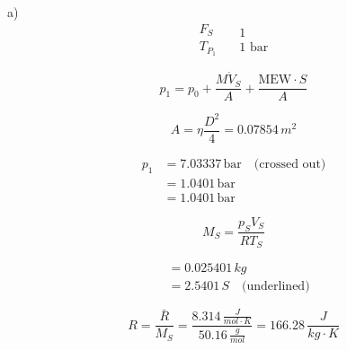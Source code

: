 a) \\
\[
\begin{array}{c}
F_S \\
\hline
T_{P_1}
\end{array}
\quad
\begin{array}{c}
1 \\
\hline
1 \text{ bar}
\end{array}
\]

\[
p_1 = p_0 + \frac{M \dot{V}_S}{A} + \frac{\text{MEW} \cdot S}{A}
\]

\[
A = \eta \frac{D^2}{4} = 0.07854 \, m^2
\]

\[
\begin{aligned}
p_1 &= 7.03337 \, \text{bar} \quad \text{(crossed out)} \\
&= 1.0401 \, \text{bar} \\
&= 1.0401 \, \text{bar}
\end{aligned}
\]

\[
M_S = \frac{p_S V_S}{R T_S}
\]

\[
\begin{aligned}
&= 0.025401 \, kg \\
&= 2.5401 \, S \quad \text{(underlined)}
\end{aligned}
\]

\[
R = \frac{\bar{R}}{M_S} = \frac{8.314 \, \frac{J}{mol \cdot K}}{50.16 \, \frac{g}{mol}} = 166.28 \, \frac{J}{kg \cdot K}
\]